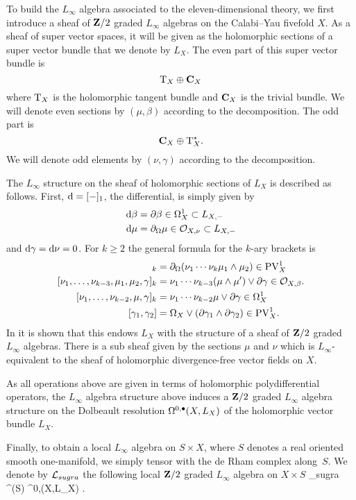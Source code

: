 To build the $L_\infty$ algebra associated to the eleven-dimensional theory, we first introduce a sheaf of $\mathbf{Z}/2$ graded $L_\infty$ algebras on the Calabi--Yau fivefold $X$.
As a sheaf of super vector spaces, it will be given as the holomorphic sections of a super vector bundle that we denote by $L_X$. 
The even part of this super vector bundle is
\[
{\rm T}_X \oplus \mathbf{C}_X 
\]
where ${\rm T}_X$ is the holomorphic tangent bundle and $\mathbf{C}_X$ is the trivial bundle.
We will denote even sections by $(\mu, \beta)$ according to the decomposition. 
The odd part is 
\[
\mathbf{C}_X \oplus {\rm T}^*_X .
\]
We will denote odd elements by $(\nu, \gamma)$ according to the decomposition. 

The $L_\infty$ structure on the sheaf of holomorphic sections of $L_X$ is described as follows. 
First, ${\rm d} = [-]_1$, the differential, is simply given by 
\begin{align*}
{\rm d} \beta & = \partial \beta \in \Omega^1_X \subset L_{X,-} \\
{\rm d} \mu & = \partial_{\Omega} \mu \in \mathcal O_{X,\nu} \subset L_{X, -}
\end{align*}
and ${\rm d} \gamma = {\rm d} \nu = 0$. 
For $k \geq 2$ the general formula for the $k$-ary brackets is 
\begin{align*}
[\nu_1, \ldots, \nu_{k-2}, \mu_1,\mu_2]_{k} & = \div(\nu_1 \cdots \nu_k \mu_1 \wedge \mu_2) \in \PV^1_X \\
[\nu_1,\ldots, \nu_{k-3}, \mu_1,\mu_2,\gamma]_k & = \nu_1 \cdots \nu_{k-3} (\mu \wedge \mu') \vee \del \gamma \in \cO_{X,\beta} .\\
[\nu_1,\ldots,\nu_{k-2}, \mu, \gamma]_k & = \nu_1 \cdots \nu_{k-2} \mu \vee \del \gamma \in \Omega^1_X \\
[\gamma_1,\gamma_2] & = \Omega_X \vee (\del \gamma_1 \wedge \del \gamma_2) \in \PV^1_X .
\end{align*}
In \cite{RSW} it is shown that this endows $L_{X}$ with the structure of a sheaf of $\mathbf{Z}/2$ graded $L_\infty$ algebras.
There is a sub sheaf given by the sections $\mu$ and $\nu$ which is $L_\infty$-equivalent to the sheaf of holomorphic divergence-free vector fields on $X$. 

As all operations above are given in terms of holomorphic polydifferential operators, the $L_\infty$ algebra structure above induces a $\mathbf{Z}/2$ graded $L_\infty$ algebra structure on the Dolbeault resolution $\Omega^{0,\bullet}(X,L_X)$ of the holomorphic vector bundle $L_X$.

Finally, to obtain a local $L_\infty$ algebra on $S \times X$, where $S$ denotes a real oriented smooth one-manifold, we simply tensor with the de Rham complex along~$S$.
We denote by $\mathcal L_{sugra}$ the following local $\mathbf{Z}/2$ graded $L_\infty$ algebra on $X \times S$
\beqn
\cL_{sugra}  \Omega^\bu(S) \hotimes \Omega^{0,\bu}(X,L_X) .
\eeqn

